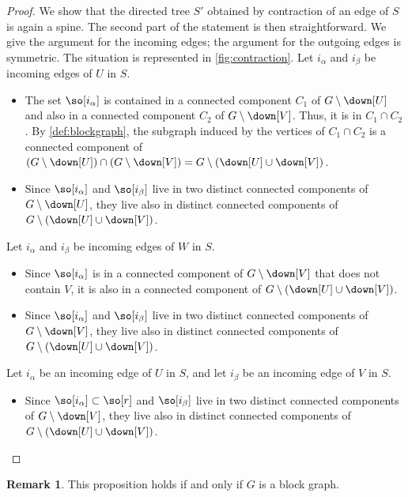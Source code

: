 \documentclass{amsart}
\theoremstyle{definition}
\newtheorem{remark}[theorem]{Remark}
\begin{document}
\begin{proof} 
  We show that the directed tree $S'$ obtained by contraction of an edge of $S$ is again a spine. The second part of the statement is then straightforward. We give the argument for the incoming edges; the argument for the outgoing edges is symmetric. The situation is represented in \cref{fig:contraction}.
Let $i_\alpha$ and $i_\beta$ be incoming edges of $U$ in $S$. 
\begin{itemize} 
  \item The set $\so[i_\alpha]$ is contained in a connected component $C_1$ of $G\setminus \down[U]$ and also in a connected component $C_2$ of $G\setminus \down[V]$. Thus, it is in $C_1\cap C_2$. By \cref{def:blockgraph}, the subgraph induced by the vertices of $C_1\cap C_2$ is a connected component of $(G \setminus \down[U]) \cap (G \setminus \down[V]) = G \setminus (\down[U]\cup\down[V])$.
  \item Since $\so[i_\alpha]$ and $\so[i_\beta]$ live in two distinct connected components of $G\setminus\down[U]$, they live also in distinct connected components of $G\setminus(\down[U]\cup\down[V])$.
\end{itemize}

Let $i_\alpha$ and $i_\beta$ be incoming edges of $W$ in $S$. 
\begin{itemize} 
  \item Since $\so[i_\alpha]$ is in a connected component of $G \setminus \down[V]$ that does not contain $V$, it is also in a connected component of $G \setminus(\down[U]\cup\down[V])$.
  \item Since $\so[i_\alpha]$ and $\so[i_\beta]$ live in two distinct connected components of $G \setminus \down[V]$, they live also in distinct connected components of $G \setminus (\down[U]\cup\down[V])$.
\end{itemize}

Let $i_\alpha$ be an incoming edge of $U$ in $S$, and let $i_\beta$ be an incoming edge of $V$ in $S$. 
\begin{itemize}
  \item Since $\so[i_\alpha] \subset \so[r]$ and $\so[i_\beta]$ live in two distinct connected components of $G \setminus \down[V]$, they live also in distinct connected components of $G \setminus (\down[U]\cup\down[V])$.
\end{itemize}
\end{proof}

\begin{remark}
  This proposition holds if and only if $G$ is a block graph. 
\end{remark}
\end{document}
